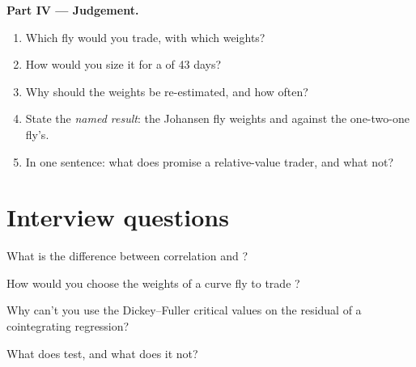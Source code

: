 \begin{problem}
\medskip\noindent\textbf{Part IV --- Judgement.}
\begin{enumerate}[resume]
\item Which fly would you trade, with which weights?
\item How would you size it for a  of 43 days?
\item Why should the weights be re-estimated, and how often?
\item State the \emph{named result}: the Johansen fly weights and  against the one-two-one fly's.
\item In one sentence: what does  promise a relative-value trader, and what not?
\end{enumerate}
\end{problem}

\section{Interview questions}

\begin{interviewq}\label{iq:qm:multivariate-series-and-cointegration:1}
What is the difference between correlation and ?
\end{interviewq}

\begin{interviewq}\label{iq:qm:multivariate-series-and-cointegration:2}
How would you choose the weights of a curve fly to trade ?
\end{interviewq}

\begin{interviewq}\label{iq:qm:multivariate-series-and-cointegration:3}
Why can't you use the Dickey--Fuller critical values on the residual of a cointegrating regression?
\end{interviewq}

\begin{interviewq}\label{iq:qm:multivariate-series-and-cointegration:4}
What does  test, and what does it not?
\end{interviewq}

